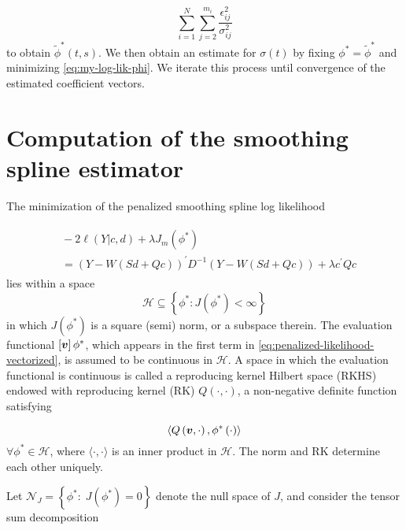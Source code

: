 \documentclass[12pt]{article}
\newcommand{\Hilbert}{\mathcal{H}}
\newcommand{\bfv}{\mbox{\boldmath $v$}}
\theoremstyle{definition}
\begin{document}
\begin{equation} \label{eq:loglik-phi-component}
 \sum_{i = 1}^N \sum_{j = 2}^{m_i} \frac{\epsilon_{ij}^2}{\sigma_{ij}^{2}}
\end{equation}
\noindent
to obtain $\tilde{\phi}^*\left(t,s\right)$. We then obtain an estimate for $\sigma\left(t\right)$ by fixing $\phi^* = \tilde{\phi}^*$ and minimizing \ref{eq:my-log-lik-phi}.  We iterate this process until convergence of the estimated coefficient vectors. 

\bigskip




\section{Computation of the smoothing spline estimator}

The minimization of the penalized smoothing spline log likelihood 

\begin{align}
\begin{split} \label{eq:penalized-likelihood-vectorized} 
 &\mbox{} -2\ell\left(Y \vert c,d\right) + \lambda J_m\left(\phi^*\right)\\
&= \left( Y - W \left( Sd + Qc \right) \right)^\prime D^{-1} \left( Y - W \left( Sd + Qc \right) \right) + \lambda c^\prime Q c 
\end{split}
\end{align} 
\bigskip
\noindent
lies within a space 
\[
\Hilbert \subseteq \left \{ \phi^*: J\left(\phi^*\right) < \infty \right\}
\]
\noindent
in which $J\left(\phi^*\right)$ is a square (semi) norm, or a subspace therein. The evaluation functional $\left[ \bfv \right] \phi^*$, which appears in the first term in \ref{eq:penalized-likelihood-vectorized}, is assumed to be continuous in $\Hilbert$. A space in which the evaluation functional is continuous is called a reproducing kernel Hilbert space (RKHS) endowed with reproducing kernel (RK) $Q\left(\cdot, \cdot\right)$, a non-negative definite function satisfying 

\[
\langle Q\left(\bfv,\cdot\right), \phi^*\left(\cdot\right) \rangle
\]
\bigskip
\noindent
$\forall \phi^* \in \Hilbert$, where $\langle \cdot, \cdot \rangle$ is an inner product in $\Hilbert$. The norm and RK determine each other uniquely.

Let $\mathcal{N}_J = \left\{ \phi^*:\; J\left(\phi^*\right) = 0\right\}$ denote the null space of $J$, and consider the tensor sum decomposition
\end{document}
